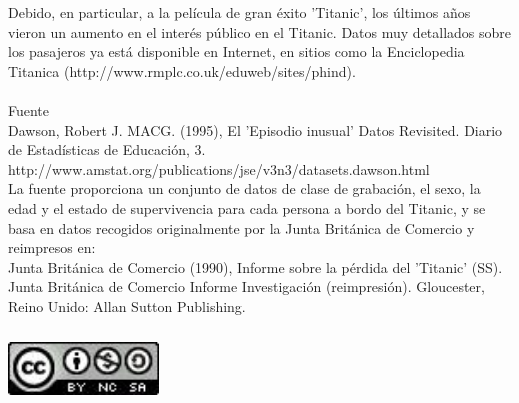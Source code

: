 \documentclass{report}
\begin{document}
\begin{justify}
Debido, en particular, a la película de gran éxito 'Titanic', los últimos años vieron un aumento en el interés público en el Titanic. Datos muy detallados sobre los pasajeros ya está disponible en Internet, en sitios como la Enciclopedia Titanica (http://www.rmplc.co.uk/eduweb/sites/phind).\\
\\
Fuente\\

Dawson, Robert J. MACG. (1995), El 'Episodio inusual' Datos Revisited. Diario de Estadísticas de Educación, 3. http://www.amstat.org/publications/jse/v3n3/datasets.dawson.html\\

La fuente proporciona un conjunto de datos de clase de grabación, el sexo, la edad y el estado de supervivencia para cada persona a bordo del Titanic, y se basa en datos recogidos originalmente por la Junta Británica de Comercio y reimpresos en:\\

Junta Británica de Comercio (1990), Informe sobre la pérdida del 'Titanic' (SS). Junta Británica de Comercio Informe Investigación (reimpresión). Gloucester, Reino Unido: Allan Sutton Publishing.\\

\end{justify}

\centering
\href{http://creativecommons.org/licenses/by-nc-sa/4.0/}{\includegraphics[width=4cm, height=2cm]{lic}}
\end{document}
